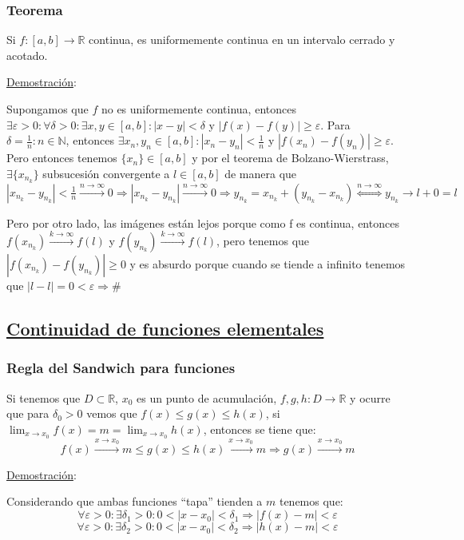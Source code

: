 \documentclass[10pt,a4paper,openright]{book}
\begin{document}
\subsubsection*{Teorema}
Si $f:[a,b]\rightarrow \mathbb R$ continua, es uniformemente continua en un intervalo cerrado y acotado.

\underline{Demostración}:\par
Supongamos que $f$ no es uniformemente continua, entonces $\exists \varepsilon> 0: \forall \delta>0: \exists x,y\in [a,b]: |x-y|<\delta$ y $|f(x)-f(y)|\geq \varepsilon$. Para $\delta = \frac{1}{n}: n\in \mathbb N$, entonces $\exists x_n, y_n\in [a,b]: |x_n-y_n|<\frac{1}{n}$ y $|f(x_n)-f(y_n)|\geq \varepsilon$. Pero entonces tenemos $\{x_n\}\in [a,b]$ y por el teorema de Bolzano-Wierstrass, $\exists \{x_{n_k}\}$ subsucesión convergente a $l\in [a,b]$ de manera que $|x_{n_k}-y_{n_k}| < \frac{1}{n} \xrightarrow{n\rightarrow \infty} 0\Rightarrow |x_{n_k}-y_{n_k}|\xrightarrow{n\rightarrow \infty} 0\Rightarrow y_{n_k}=x_{n_k}+(y_{n_k}-x_{n_k})\stackrel{n\rightarrow \infty}{\Leftrightarrow} y_{n_k}\rightarrow l+0=l$

Pero por otro lado, las imágenes están lejos porque como f es continua, entonces $f(x_{n_k})\xrightarrow{k\rightarrow \infty}f(l)$ y $f(y_{n_k})\xrightarrow{k\rightarrow \infty}f(l)$, pero tenemos que $|f(x_{n_k})-f(y_{n_k})|\geq 0$ y es absurdo porque cuando se tiende a infinito tenemos que $|l-l|=0<\varepsilon\Rightarrow \#$
\vspace{3cm}

\subsection*{\underline{Continuidad de funciones elementales}}
\subsubsection*{Regla del Sandwich para funciones}
Si tenemos que $D\subset \mathbb R$, $x_0$ es un punto de acumulación, $f,g,h: D\rightarrow\mathbb R$ y ocurre que para $\delta_0>0$ vemos que $f(x)\leq g(x)\leq h(x)$, si $\lim_{x\rightarrow x_0} f(x)=m=\lim_{x\rightarrow x_0} h(x)$, entonces se tiene que:
$$f(x)\xrightarrow{x\rightarrow x_0} m \leq g(x)\leq h(x)\xrightarrow{x\rightarrow x_0}m\Rightarrow g(x)\xrightarrow{x\rightarrow x_0}m$$

\underline{Demostración}:\par
Considerando que ambas funciones ``tapa'' tienden a $m$ tenemos que:
$$\forall \varepsilon>0 : \exists \delta_1>0 : 0<|x-x_0|<\delta_1\Rightarrow |f(x)-m|<\varepsilon$$
$$\forall \varepsilon>0: \exists \delta_2>0: 0<|x-x_0|<\delta_2\Rightarrow |h(x)-m|<\varepsilon$$
\end{document}
